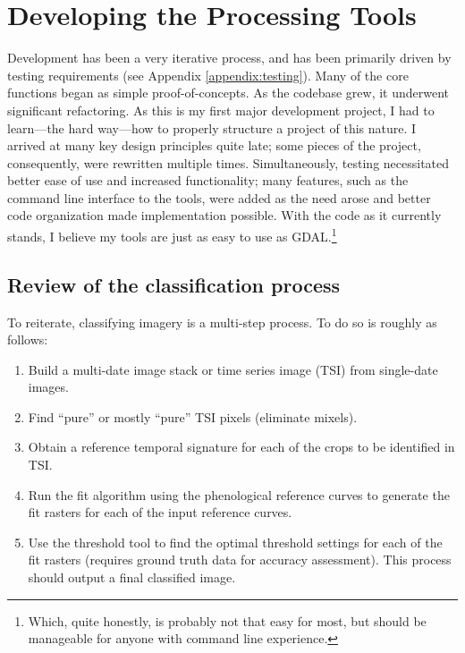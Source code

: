 \chapter{Developing the Processing Tools}
\label{appendix:tools}

Development has been a very iterative process, and has been primarily driven by testing requirements (see Appendix \ref{appendix:testing}). Many of the core functions began as simple proof-of-concepts. As the codebase grew, it underwent significant refactoring. As this is my first major development project, I had to learn---the hard way---how to properly structure a project of this nature. I arrived at many key design principles quite late; some pieces of the project, consequently, were rewritten multiple times. Simultaneously, testing necessitated better ease of use and increased functionality; many features, such as the command line interface to the tools, were added as the need arose and better code organization made implementation possible. With the code as it currently stands, I believe my tools are just as easy to use as GDAL.\footnote{Which, quite honestly, is probably not that easy for most, but should be manageable for anyone with command line experience.}

\section{Review of the classification process}

To reiterate, classifying imagery is a multi-step process. To do so is roughly as follows:

\begin{Spacing}{1.2}
\begin{enumerate}
  \item Build a multi-date image stack or time series image (TSI) from single-date images.
  \item Find “pure” or mostly “pure” TSI pixels (eliminate mixels).
  \item Obtain a reference temporal signature for each of the crops to be identified in TSI.
  \item Run the fit algorithm using the phenological reference curves to generate the fit rasters for each of the input reference curves.
  \item Use the threshold tool to find the optimal threshold settings for each of the fit rasters (requires ground truth data for accuracy assessment). This process should output a final classified image.
\end{enumerate}
\end{Spacing}

